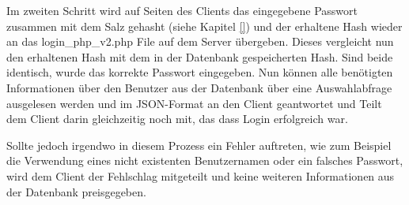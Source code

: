 \documentclass[a4paper,11pt]{report}
\begin{document}
					Im zweiten Schritt wird auf Seiten des Clients das eingegebene Passwort zusammen mit dem Salz gehasht (siehe Kapitel \ref{}) und der erhaltene Hash wieder an das login\_php\_v2.php File auf dem Server übergeben. Dieses vergleicht nun den erhaltenen Hash mit dem in der Datenbank gespeicherten Hash. Sind beide identisch, wurde das korrekte Passwort eingegeben. Nun können alle benötigten Informationen über den Benutzer aus der Datenbank über eine Auswahlabfrage ausgelesen werden und im JSON-Format an den Client geantwortet und Teilt dem Client darin gleichzeitig noch mit, das dass Login erfolgreich war.
					
					Sollte jedoch irgendwo in diesem Prozess ein Fehler auftreten, wie zum Beispiel die Verwendung eines nicht existenten Benutzernamen oder ein falsches Passwort, wird dem Client der Fehlschlag mitgeteilt und keine weiteren Informationen aus der Datenbank preisgegeben.
					

					
\end{document}
